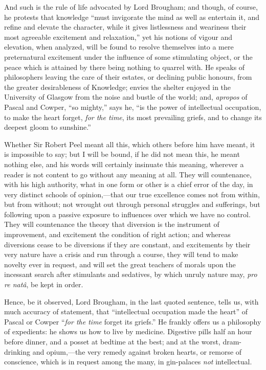 And such is the rule of life advocated by Lord Brougham; and
though, of course, he protests that knowledge ``must invigorate
the mind as well as entertain it, and refine and elevate the
character, while it gives listlessness and weariness their most
agreeable excitement and relaxation,'' yet his notions of vigour
and elevation, when analyzed, will be found to resolve themselves into
a mere preternatural excitement under the influence of some
stimulating object, or the peace which is attained by there being
nothing to quarrel with. He speaks of philosophers leaving the care of
their estates, or declining public honours, from the greater
desirableness of Knowledge; envies the shelter enjoyed in the
University of Glasgow from the noise and bustle of the world; and, \emph{apropos}
of Pascal and Cowper, ``so mighty,'' says he, ``is the
power of intellectual occupation, to make the heart forget, \emph{for the
time}, its most prevailing griefs, and to change its deepest gloom
to sunshine.''

Whether Sir Robert Peel meant all this, which others before him
have meant, it is impossible to say; but I will be bound, if he did
not mean this, he meant nothing else, and his words will
certainly insinuate this meaning, wherever a reader is not content to
go without any meaning at all. They will countenance, with his high
authority, what in one form or other is a chief error of the day, in
very distinct schools of opinion,—that our true excellence comes not
from within, but from without; not wrought out through personal
struggles and sufferings, but following upon a passive exposure to
influences over which we have no control. They will countenance the
theory that diversion is the instrument of improvement, and excitement
the condition of right action; and whereas diversions cease to be
diversions if they are constant, and excitements by their very nature
have a crisis and run through a course, they will tend to make novelty
ever in request, and will set the great teachers of morals upon the
incessant search after stimulants and sedatives, by which unruly
nature may, \emph{pro re natâ}, be kept in order.

Hence, be it observed, Lord Brougham, in the last quoted sentence,
tells us, with much accuracy of statement, that ``intellectual
occupation made the heart'' of Pascal or Cowper ``\emph{for the
time} forget its griefs.'' He frankly offers us a philosophy of
expedients: he shows us how to live by medicine. Digestive pills half
an hour before dinner, and a posset at bedtime at the best; and at the
worst, dram-drinking and opium,—the very remedy against broken
hearts, or remorse of conscience, which is in request among the many,
in gin-palaces \emph{not} intellectual.

